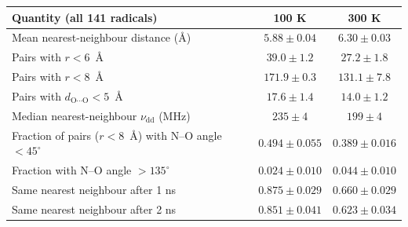 \begin{tabular}{lcc}
\toprule
Quantity (all 141 radicals) & 100 K & 300 K\\
\midrule
Mean nearest-neighbour distance (\AA) & $5.88\pm0.04$ & $6.30\pm0.03$\\
Pairs with $r<6$~\AA & $39.0\pm1.2$ & $27.2\pm1.8$\\
Pairs with $r<8$~\AA & $171.9\pm0.3$ & $131.1\pm7.8$\\
Pairs with $d_\mathrm{O\cdots O}<5$~\AA & $17.6\pm1.4$ & $14.0\pm1.2$\\
Median nearest-neighbour $\nu_\mathrm{dd}$ (MHz) & $235\pm4$ & $199\pm4$\\
Fraction of pairs ($r<8$~\AA) with N--O angle $<45^\circ$ & $0.494\pm0.055$ & $0.389\pm0.016$\\
Fraction with N--O angle $>135^\circ$ & $0.024\pm0.010$ & $0.044\pm0.010$\\
Same nearest neighbour after 1 ns & $0.875\pm0.029$ & $0.660\pm0.029$\\
Same nearest neighbour after 2 ns & $0.851\pm0.041$ & $0.623\pm0.034$\\
\bottomrule
\end{tabular}

